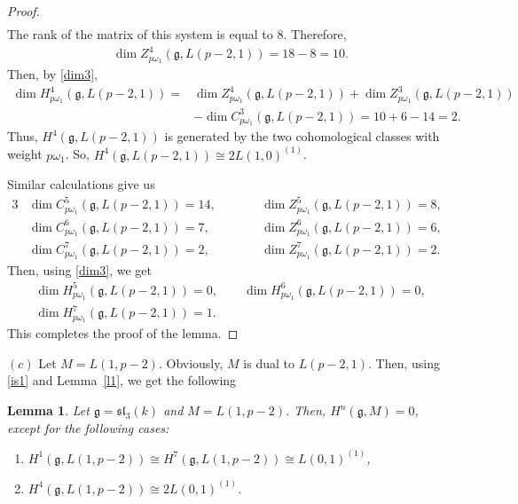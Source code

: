 \documentclass[10pt,a4paper]{amsart}
\numberwithin{equation}{section}
\newtheorem{Lemma}[Theorem]{Lemma}
\begin{document}
\begin{proof}
\begin{gather*}
\end{gather*}
The rank of the matrix of this system is equal to $8$. Therefore,
\begin{gather*}
\dim Z^4_{p\omega_1}(\mathfrak{g},L(p-2,1))=18-8=10.
\end{gather*}
Then, by \eqref{dim3},
\begin{align*}
\dim H^4_{p\omega_1}(\mathfrak{g},L(p-2,1))={}&
\dim Z^4_{p\omega_1}(\mathfrak{g},L(p-2,1))+\dim Z^3_{p\omega_1}(\mathfrak{g},L(p-2,1))
\\
&-\dim C^3_{p\omega_1}(\mathfrak{g},L(p-2,1))=10+6-14=2.
\end{align*}
Thus, $H^4(\mathfrak{g},L(p-2,1))$ is generated by the two cohomological classes with weight $p\omega_1$. So, $H^4(\mathfrak{g},L(p-2,1))\cong 2L(1,0)^{(1)}$.

Similar calculations give us
\begin{alignat*}{3}
&\dim C^5_{p\omega_1}(\mathfrak{g},L(p-2,1))=14, \qquad&&\dim Z^5_{p\omega_1}(\mathfrak{g},L(p-2,1))=8,&
\\
&\dim C^6_{p\omega_1}(\mathfrak{g},L(p-2,1))=7, \qquad&&\dim Z^6_{p\omega_1}(\mathfrak{g},L(p-2,1))=6,&
\\
&\dim C^7_{p\omega_1}(\mathfrak{g},L(p-2,1))=2, \qquad&&\dim Z^7_{p\omega_1}(\mathfrak{g},L(p-2,1))=2.&
\end{alignat*}
Then, using \eqref{dim3}, we get
\begin{gather*}
\dim H^5_{p\omega_1}(\mathfrak{g},L(p-2,1))=0,\qquad
\dim H^6_{p\omega_1}(\mathfrak{g},L(p-2,1))=0,
\\
\dim H^7_{p\omega_1}(\mathfrak{g},L(p-2,1))=1.
\end{gather*}
This completes the proof of the lemma.
\end{proof}

$(c)$ Let $M=L(1,p-2)$. Obviously, $M$ is dual to $L(p-2,1)$. Then, using \eqref{is1} and Lemma~\ref{l1}, we get the following

\begin{Lemma}%
Let $\mathfrak{g}=\mathfrak{sl}_3(k)$ and $M=L(1,p-2)$. Then, $H^n(\mathfrak{g},M)=0$, except for the following cases:

\begin{enumerate}\itemsep=0pt

\item[$(i)$] $H^1(\mathfrak{g},L(1,p-2))\cong H^7(\mathfrak{g},L(1,p-2))\cong L(0,1)^{(1)}$,

\item[$(ii)$] $H^4(\mathfrak{g},L(1,p-2))\cong 2L(0,1)^{(1)}$.

\end{enumerate}
\end{Lemma}
\end{document}
